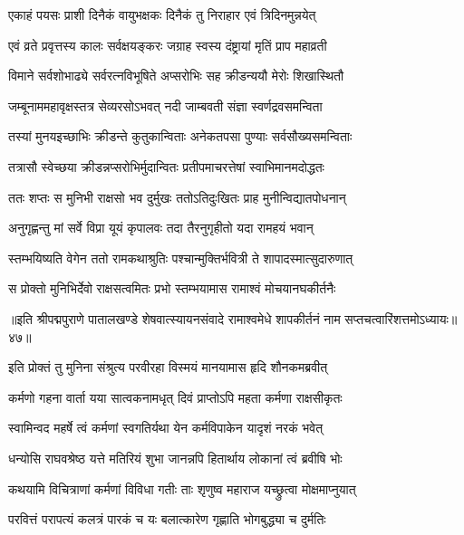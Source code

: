 \twolineshloka
{एकाहं पयसः प्राशी दिनैकं वायुभक्षकः}
{दिनैकं तु निराहार एवं त्रिदिनमुन्नयेत्}%

\twolineshloka
{एवं व्रते प्रवृत्तस्य कालः सर्वक्षयङ्करः}
{जग्राह स्वस्य दंष्ट्रायां मृतिं प्राप महाव्रती}%

\twolineshloka
{विमाने सर्वशोभाढ्ये सर्वरत्नविभूषिते}
{अप्सरोभिः सह क्रीडन्ययौ मेरोः शिखास्थितौ}%

\twolineshloka
{जम्बूनाममहावृक्षस्तत्र सेव्यरसोऽभवत्}
{नदी जाम्बवती संज्ञा स्वर्णद्रवसमन्विता}%

\twolineshloka
{तस्यां मुनयइच्छाभिः क्रीडन्ते कुतुकान्विताः}
{अनेकतपसा पुण्याः सर्वसौख्यसमन्विताः}%

\twolineshloka
{तत्रासौ स्वेच्छया क्रीडन्नप्सरोभिर्मुदान्वितः}
{प्रतीपमाचरत्तेषां स्वाभिमानमदोद्धतः}%

\twolineshloka
{ततः शप्तः स मुनिभी राक्षसो भव दुर्मुखः}
{ततोऽतिदुःखितः प्राह मुनीन्विद्यातपोधनान्}%

\twolineshloka
{अनुगृह्णन्तु मां सर्वे विप्रा यूयं कृपालवः}
{तदा तैरनुगृहीतो यदा रामहयं भवान्}%

\twolineshloka
{स्तम्भयिष्यति वेगेन ततो रामकथाश्रुतिः}
{पश्चान्मुक्तिर्भवित्री ते शापादस्मात्सुदारुणात्}%

\twolineshloka
{स प्रोक्तो मुनिभिर्देवो राक्षसत्वमितः प्रभो}
{स्तम्भयामास रामाश्वं मोचयानघकीर्तनैः}%

{॥इति श्रीपद्मपुराणे पातालखण्डे शेषवात्स्यायनसंवादे रामाश्वमेधे शापकीर्तनं नाम सप्तचत्वारिंशत्तमोऽध्यायः॥४७॥}



\twolineshloka
{इति प्रोक्तं तु मुनिना संश्रुत्य परवीरहा}
{विस्मयं मानयामास हृदि शौनकमब्रवीत्}%


\twolineshloka
{कर्मणो गहना वार्ता यया सात्वकनामधृत्}
{दिवं प्राप्तोऽपि महता कर्मणा राक्षसीकृतः}%

\twolineshloka
{स्वामिन्वद महर्षे त्वं कर्मणां स्वगतिर्यथा}
{येन कर्मविपाकेन यादृशं नरकं भवेत्}%


\twolineshloka
{धन्योसि राघवश्रेष्ठ यत्ते मतिरियं शुभा}
{जानन्नपि हितार्थाय लोकानां त्वं ब्रवीषि भोः}%

\twolineshloka
{कथयामि विचित्राणां कर्मणां विविधा गतीः}
{ताः शृणुष्व महाराज यच्छ्रुत्वा मोक्षमाप्नुयात्}%

\twolineshloka
{परवित्तं परापत्यं कलत्रं पारकं च यः}
{बलात्कारेण गृह्णाति भोगबुद्ध्या च दुर्मतिः}%

